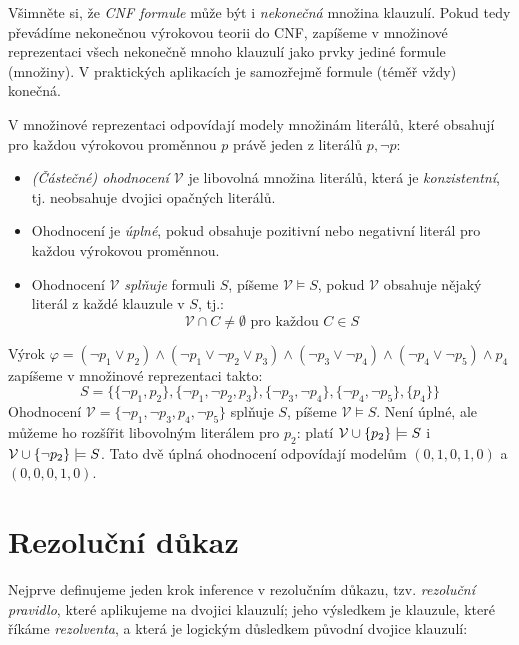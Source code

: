 \begin{remark}
    Všimněte si, že \emph{CNF formule} může být i \emph{nekonečná} množina klauzulí. Pokud tedy převádíme nekonečnou výrokovou teorii do CNF, zapíšeme v množinové reprezentaci všech nekonečně mnoho klauzulí jako prvky jediné formule (množiny). V praktických aplikacích je samozřejmě formule (téměř vždy) konečná.
\end{remark}

V množinové reprezentaci odpovídají modely množinám literálů, které obsahují pro každou výrokovou proměnnou $p$ právě jeden z literálů $p,\neg p$:
\begin{itemize}
    \item \emph{(Částečné) ohodnocení $\mathcal V$} je libovolná množina literálů, která je \emph{konzistentní}, tj. neobsahuje dvojici opačných literálů. 
    \item Ohodnocení je \emph{úplné}, pokud obsahuje pozitivní nebo negativní literál pro každou výrokovou proměnnou.
    \item Ohodnocení $\mathcal V$ \emph{splňuje} formuli $S$, píšeme $\mathcal V\models S$, pokud $\mathcal V$ obsahuje nějaký literál z každé klauzule v $S$, tj.:
    $$
    \mathcal V\cap C\neq\emptyset\text{ pro každou }C\in S
    $$
\end{itemize}

\begin{example}\label{example:set-representation}
    Výrok $\varphi=(\neg p_1\lor p_2)\land(\neg p_1\lor\neg p_2\lor p_3)\land(\neg p_3\lor\neg p_4)\land(\neg p_4\lor \neg p_5)\land p_4$ zapíšeme v množinové reprezentaci takto:
    $$
    S=\{\{\neg p_1,p_2\},\{\neg p_1,\neg p_2,p_3\},\{\neg p_3,\neg p_4\},\{\neg p_4,\neg p_5\},\{p_4\}\}
    $$
    Ohodnocení $\mathcal V=\{\neg p_1,\neg p_3,p_4,\neg p_5\}$ splňuje $S$, píšeme $\mathcal V\models S$. Není úplné, ale můžeme ho rozšířit libovolným literálem pro $p_2$: platí $\mathcal V\mathbin{\cup}\{p_2\}\models S$ i $\mathcal V\mathbin{\cup}\{\neg p_2\}\models S$. Tato dvě úplná ohodnocení odpovídají modelům $(0,1,0,1,0)$ a $(0,0,0,1,0)$.
\end{example}


\section{Rezoluční důkaz}

Nejprve definujeme jeden krok inference v rezolučním důkazu, tzv. \emph{rezoluční pravidlo}, které aplikujeme na dvojici klauzulí; jeho výsledkem je klauzule, které říkáme \emph{rezolventa}, a která je logickým důsledkem původní dvojice klauzulí:


